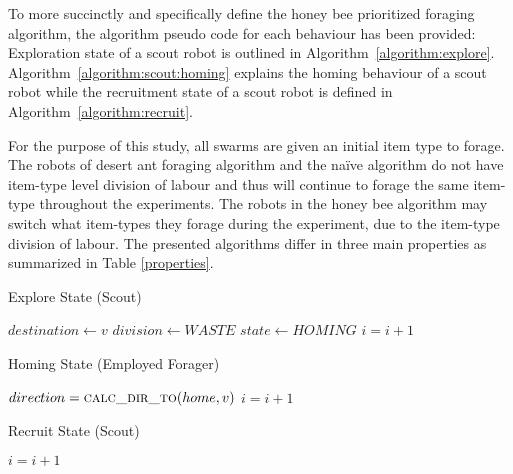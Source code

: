 To more succinctly and specifically define the honey bee prioritized foraging algorithm, the algorithm pseudo code for each behaviour has been provided: Exploration state of a scout robot is outlined in Algorithm~\ref{algorithm:explore}. Algorithm~\ref{algorithm:scout:homing} explains the homing behaviour of a scout robot while the recruitment state of a scout robot is defined in Algorithm~\ref{algorithm:recruit}. 

For the purpose of this study, all swarms are given an initial item type to forage. The robots of desert ant foraging algorithm and the na\"ive algorithm do not have item-type level division of labour and thus will continue to forage the same item-type throughout the experiments. The robots in the honey bee algorithm may switch what item-types they forage during the experiment, due to the item-type division of labour. The presented algorithms differ in three main properties as summarized in Table \ref{properties}.

\begin{algorithm}
\caption{Explore State (Scout)}
\label{algorithm:explore}
\begin{algorithmic}[1]
\State {}
\State {}
 	\State {}
	\State $destination \gets v$
	\State {}
	\State $division \gets WASTE$
	\State $state \gets HOMING$
\EndIf
\State $i =i + 1$
\EndFunction
\end{algorithmic}
\end{algorithm}

\begin{algorithm}
\caption{Homing State (Employed Forager)}
\label{algorithm:employedforager:homing}
\begin{algorithmic}[1]
\State $direction = \Call{calc\_dir\_to}{home,v}$
\State {}
\EndIf
\State $i =i + 1$
\EndFunction
\end{algorithmic}
\end{algorithm}

\begin{algorithm}
\caption{Recruit State (Scout)}
\label{algorithm:recruit}
\begin{algorithmic}[1]
	\State {} 
\Else 
	\Else
	\EndIf
\EndIf
\State $i =i + 1$
\EndFunction
\end{algorithmic}
\end{algorithm}

